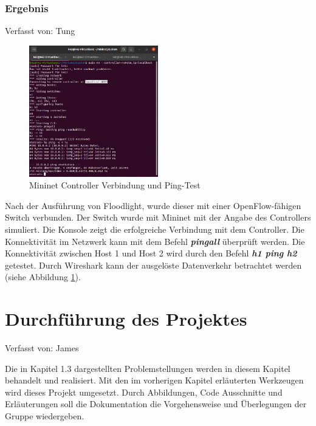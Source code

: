 \documentclass[fontsize=12pt,paper=a4,open=any,parskip=half,
  twoside=false,toc=listof,toc=bibliography,fleqn,leqno,
  captions=nooneline,captions=tableabove,british]{scrbook}
\begin{document}
\subsection{Ergebnis}
{\tiny Verfasst von: Tung\par}
\begin{figure}
	\vspace{-\baselineskip}
    \centering
    \includegraphics[width=0.5\textwidth]{Bilder/ping}
    \caption{Mininet Controller Verbindung und Ping-Test}
    \label{ping}
\end{figure}

Nach der Ausführung von Floodlight, wurde dieser mit einer OpenFlow-fähigen Switch verbunden. Der Switch wurde mit Mininet mit der Angabe des Controllers simuliert. Die Konsole zeigt die erfolgreiche Verbindung mit dem Controller. Die Konnektivität im Netzwerk kann mit dem Befehl \textit{\textbf{pingall}} überprüft werden. Die Konnektivität zwischen Host 1 und Host 2 wird durch den Befehl \textit{\textbf{h1 ping h2}} getestet. Durch Wireshark kann der ausgelöste Datenverkehr betrachtet werden (siehe Abbildung \ref{ping}).



\chapter{Durchführung des Projektes}
{\tiny Verfasst von: James\par}
Die in Kapitel 1.3 dargestellten Problemstellungen werden in diesem Kapitel behandelt und realisiert. Mit den im vorherigen Kapitel erläuterten Werkzeugen wird dieses Projekt umgesetzt. Durch Abbildungen, Code Ausschnitte und Erläuterungen soll die Dokumentation die Vorgehensweise und Überlegungen der Gruppe wiedergeben. 
\end{document}
